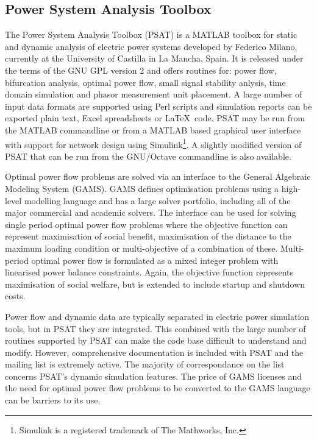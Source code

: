 \subsection{Power System Analysis Toolbox}
\label{sec:psat}
The Power System Analysis Toolbox (PSAT) is a MATLAB toolbox for static and
dynamic analysis of electric power systems developed by Federico Milano,
currently at the University of Castilla in La Mancha, Spain.  It is released
under the terms of the GNU GPL version 2 and offers routines for:  power flow,
bifurcation analysis, optimal power flow, small signal stability anlysis, time
domain simulation and phasor measurement unit placement.  A large number of
input data formats are supported using Perl scripts and simulation reports can
be exported plain text, Excel spreadsheets or \LaTeX~code.  PSAT may be run
from the MATLAB commandline or from a MATLAB based graphical user interface
with support for network design using Simulink\footnote{Simulink is a
registered trademark of The Mathworks, Inc.}.  A slightly modified version of
PSAT that can be run from the GNU/Octave commandline is also available.

Optimal power flow problems are solved via an interface to the General
Algebraic Modeling System (GAMS).  GAMS defines optimisation problems using a
high-level modelling language and has a large solver portfolio, including all
of the major commercial and academic solvers.  The interface can be used for
solving single period optimal power flow problems where the objective function
can represent maximisation of social benefit, maximisation of the distance to
the maximum loading condition or multi-objective of a combination of these.
Multi-period optimal power flow is formulated as a mixed integer problem with
linearised power balance constraints.  Again, the objective function represents
maximisation of social welfare, but is extended to include startup and
shutdown costs.

Power flow and dynamic data are typically separated in electric power
simulation tools, but in PSAT they are integrated.  This combined with the
large number of routines supported by PSAT can make the code base difficult to
understand and modify.  However, comprehensive documentation is included with
PSAT and the mailing list is extremely active.  The majority of correspondance
on the list concerns PSAT's dynamic simulation features.  The price of
GAMS licenses and the need for optimal power flow problems to be converted to
the GAMS language can be barriers to its use.

